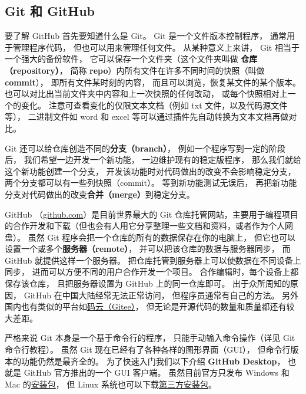 

\begin{issues}
\issueTODO
\end{issues}

\subsection{Git 和 GitHub}
要了解 GitHub 首先要知道什么是 Git。 Git 是一个文件版本控制程序， 通常用于管理程序代码， 但也可以用来管理任何文件。 从某种意义上来讲， Git 相当于一个强大的备份软件， 它可以保存一个文件夹（这个文件夹叫做 \textbf{仓库（repository）}， 简称 \textbf{repo}）内所有文件在许多不同时间的快照（叫做 \textbf{commit}）， 即所有文件某时刻的内容， 而且可以浏览，恢复某文件的某个版本。 也可以对比出当前文件夹中内容和上一次快照的任何改动， 或每个快照相对上一个的变化。 注意可查看变化的仅限文本文档（例如 txt 文件，以及代码源文件等）， 二进制文件如 word 和 excel 等可以通过插件先自动转换为文本文档再做对比。

Git 还可以给仓库创造不同的\textbf{分支（branch）}， 例如一个程序写到一定的阶段后， 我们希望一边开发一个新功能， 一边维护现有的稳定版程序， 那么我们就给这个新功能创建一个分支， 开发该功能时对代码做出的改变不会影响稳定分支， 两个分支都可以有一些列快照（commit）。 等到新功能测试无误后， 再把新功能分支对代码做出的改变\textbf{合并（merge）}到稳定分支。

GitHub （\href{https://github.com}{github.com}）是目前世界最大的 Git 仓库托管网站，主要用于编程项目的合作开发和下载（但也会有人用它分享整理一些文档和资料，或者作为个人网盘）。 虽然 Git 程序会把一个仓库的所有的数据保存在你的电脑上， 但它也可以设置一个或多个\textbf{服务器（remote）}， 并可以把该仓库的数据与服务器同步， 而 GitHub 就提供这样一个服务器。 把仓库托管到服务器上可以使数据在不同设备上同步， 进而可以方便不同的用户合作开发一个项目。 合作编辑时，每个设备上都保存该仓库， 且把服务器设置为 GitHub 上的同一仓库即可。 出于众所周知的原因， GitHub 在中国大陆经常无法正常访问， 但程序员通常有自己的方法。 另外国内也有类似的平台如\href{https://gitee.com/}{码云（Gitee）}， 但无论是开源代码的数量和质量都还有较大差距。

严格来说 Git 本身是一个基于命令行的程序， 只能手动输入命令操作（详见 Git 命令行教程）。 虽然 Git 现在已经有了各种各样的图形界面（GUI）， 但命令行版本的功能仍然是最齐全的。 为了快速入门我们以下介绍 \textbf{GitHub Desktop}， 也就是 GitHub 官方推出的一个 GUI 客户端。 虽然目前官方只发布 Windows 和 Mac 的\href{https://desktop.github.com/}{安装包}， 但 Linux 系统也可以下载\href{https://github.com/shiftkey/desktop/releases}{第三方安装包}。
 
